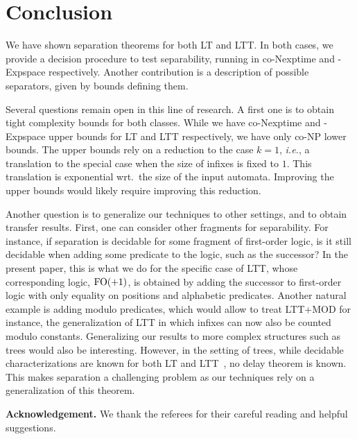 \documentclass{LMCS}
\newcommand\mypar[1]{\par\medskip\noindent\textbf{#1}}
\newcommand{\lt}{\textup{LT}\xspace}
\newcommand{\ltt}{\textup{LTT}\xspace}
\newcommand{\lttm}{\textup{LTT+MOD}\xspace}
\newcommand{\fos}{\ensuremath{\textup{FO}(+1)}\xspace}
\theoremstyle{plain}
\begin{document}
\section{Conclusion}
\label{sec:conc}
\makeatletter{}We have shown separation theorems for both \lt and \ltt. In both cases,
we provide a decision procedure to test separability,
running in {\sc co-Nexptime} and {-Expspace}
respectively. Another contribution is a description of possible
separators, given by bounds defining them.

Several questions remain open in this line of research. A first one is
to obtain tight complexity bounds for both classes. While we have {\sc
  co-Nexptime} and {-Expspace} upper bounds for \lt and \ltt
respectively, we have only {\sc co-NP} lower bounds.  The upper bounds
rely on a reduction to the case $k=1$, \emph{i.e.}, a translation to
the special case when the size of infixes is fixed to $1$. This translation is exponential wrt.\
the size of the input automata. Improving the upper bounds would likely require improving
this reduction.

Another question is to generalize our techniques to other settings, and to
obtain transfer results. First, one can consider other fragments for
separability.  For instance, if separation is decidable for some fragment of
first-order logic, is it still decidable when adding some predicate to the
logic, such as the successor? In the present paper, this is what we do for the
specific case of \ltt, whose corresponding logic, \fos, is obtained by adding the successor to
first-order logic with only equality on positions and alphabetic
predicates. Another natural example is adding modulo predicates, which would
allow to treat \lttm for instance, the generalization of \ltt in which infixes
can now also be counted modulo constants. Generalizing our results to more
complex structures such as trees would also be interesting. However, in the
setting of trees, while decidable characterizations are known for both \lt and
\ltt~\cite{bsltt,pslt}, no delay theorem is known. This makes separation a
challenging problem as our techniques rely on a generalization of this
theorem.








\mypar{Acknowledgement.} We thank the referees for their careful reading and
helpful suggestions.
\end{document}
